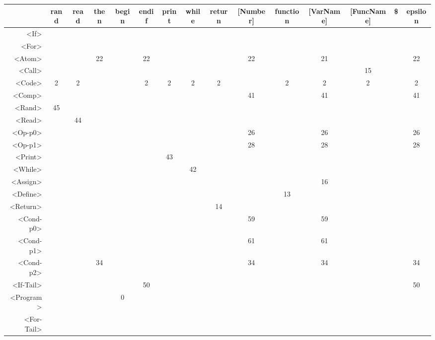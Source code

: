\begin{tabular}{r|c@{ }c@{ }c@{ }c@{ }c@{ }c@{ }c@{ }c@{ }c@{ }c@{ }c@{ }c@{ }c@{ }c@{ }}
 & rand & read & then & begin & endif & print & while & return & [Number] & function & [VarName] & [FuncName] & \$ & epsilon \\\hline
<If> &   &   &   &   &   &   &   &   &   &   &   &   &   &   \\\hline
<For> &   &   &   &   &   &   &   &   &   &   &   &   &   &   \\\hline
<Atom> &   &   & 22 &   & 22 &   &   &   & 22 &   & 21 &   &   & 22 \\\hline
<Call> &   &   &   &   &   &   &   &   &   &   &   & 15 &   &   \\\hline
<Code> & 2 & 2 &   &   & 2 & 2 & 2 & 2 &   & 2 & 2 & 2 &   & 2 \\\hline
<Comp> &   &   &   &   &   &   &   &   & 41 &   & 41 &   &   & 41 \\\hline
<Rand> & 45 &   &   &   &   &   &   &   &   &   &   &   &   &   \\\hline
<Read> &   & 44 &   &   &   &   &   &   &   &   &   &   &   &   \\\hline
<Op-p0> &   &   &   &   &   &   &   &   & 26 &   & 26 &   &   & 26 \\\hline
<Op-p1> &   &   &   &   &   &   &   &   & 28 &   & 28 &   &   & 28 \\\hline
<Print> &   &   &   &   &   & 43 &   &   &   &   &   &   &   &   \\\hline
<While> &   &   &   &   &   &   & 42 &   &   &   &   &   &   &   \\\hline
<Assign> &   &   &   &   &   &   &   &   &   &   & 16 &   &   &   \\\hline
<Define> &   &   &   &   &   &   &   &   &   & 13 &   &   &   &   \\\hline
<Return> &   &   &   &   &   &   &   & 14 &   &   &   &   &   &   \\\hline
<Cond-p0> &   &   &   &   &   &   &   &   & 59 &   & 59 &   &   &   \\\hline
<Cond-p1> &   &   &   &   &   &   &   &   & 61 &   & 61 &   &   &   \\\hline
<Cond-p2> &   &   & 34 &   &   &   &   &   & 34 &   & 34 &   &   & 34 \\\hline
<If-Tail> &   &   &   &   & 50 &   &   &   &   &   &   &   &   & 50 \\\hline
<Program> &   &   &   & 0 &   &   &   &   &   &   &   &   &   &   \\\hline
<For-Tail> &   &   &   &   &   &   &   &   &   &   &   &   &   &   \\\hline

\end{tabular}
